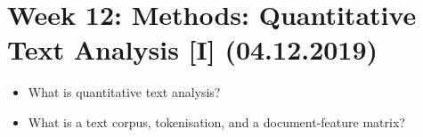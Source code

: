 \documentclass[abstract=on,parskip=full,headings=standardclasses,fontsize=11pt,paper=a4]{scrartcl}
\begin{document}

\section{Week 12: Methods: Quantitative Text Analysis [I] (04.12.2019)}

\begin{itemize}
\renewcommand\labelitemi{--}
\item What is quantitative text analysis?
\item What is a text corpus, tokenisation, and a document-feature matrix?
\end{itemize}
\end{document}
